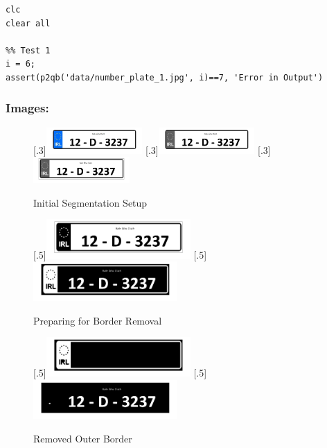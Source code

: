 \documentclass[a4paper]{article}
\begin{document}
\begin{lstlisting}[caption={Part 2 b Unit Test}]
clc
clear all

%% Test 1
i = 6;
assert(p2qb('data/number_plate_1.jpg', i)==7, 'Error in Output')
\end{lstlisting}
	\subsubsection{Images:}
	\begin{figure}[H]
		\centering
		[.3\linewidth]{\includegraphics[height=1cm]{Results/Q2/NumPlate2/qanumber_plate_2.jpg}}%
		[.3\linewidth]{\includegraphics[height=1cm]{Results/Q2/NumPlate2/qanumber_plate_2Grey.jpg}}%
		[.3\linewidth]{\includegraphics[height=1cm]{Results/Q2/NumPlate2/qanumber_plate_2Low.jpg}}%
		\caption{Initial Segmentation Setup}
		\label{fig:}
	\end{figure}
	\begin{figure}[H]
		\centering
		[.5\linewidth]{\includegraphics[height=1.5cm]{Results/Q2/NumPlate2/qanumber_plate_2Mid.jpg}}%
		[.5\linewidth]{\includegraphics[height=1.5cm]{Results/Q2/NumPlate2/qanumber_plate_2Not.jpg}}%
		\caption{Preparing for Border Removal}
		\label{fig:}
	\end{figure}
	\begin{figure}[H]
		\centering
		[.5\linewidth]{\includegraphics[height=1.5cm]{Results/Q2/NumPlate2/qanumber_plate_2Border.jpg}}%
		[.5\linewidth]{\includegraphics[height=1.5cm]{Results/Q2/NumPlate2/qanumber_plate_2NoBorder.jpg}}%
		\caption{Removed Outer Border}
		\label{fig:}
	\end{figure}
\end{document}
